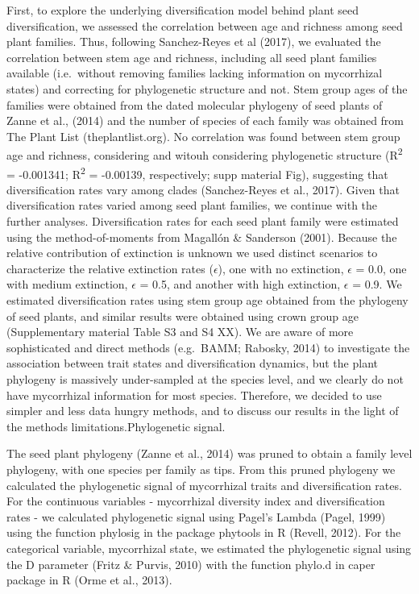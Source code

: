 \documentclass[12pt,]{article}
\begin{document}
First, to explore the underlying diversification model behind plant seed
diversification, we assessed the correlation between age and richness
among seed plant families. Thus, following Sanchez-Reyes et al (2017),
we evaluated the correlation between stem age and richness, including
all seed plant families available (i.e.~without removing families
lacking information on mycorrhizal states) and correcting for
phylogenetic structure and not. Stem group ages of the families were
obtained from the dated molecular phylogeny of seed plants of Zanne et
al., (2014) and the number of species of each family was obtained from
The Plant List (theplantlist.org). No correlation was found between stem
group age and richness, considering and witouh considering phylogenetic
structure (R\textsuperscript{2} = -0.001341; R\textsuperscript{2} =
-0.00139, respectively; supp material Fig), suggesting that
diversification rates vary among clades (Sanchez-Reyes et al., 2017).
Given that diversification rates varied among seed plant families, we
continue with the further analyses. Diversification rates for each seed
plant family were estimated using the method-of-moments from Magallón \&
Sanderson (2001). Because the relative contribution of extinction is
unknown we used distinct scenarios to characterize the relative
extinction rates (\(\epsilon\)), one with no extinction, \(\epsilon\) =
0.0, one with medium extinction, \(\epsilon\) = 0.5, and another with
high extinction, \(\epsilon\) = 0.9. We estimated diversification rates
using stem group age obtained from the phylogeny of seed plants, and
similar results were obtained using crown group age (Supplementary
material Table S3 and S4 XX). We are aware of more sophisticated and
direct methods (e.g.~BAMM; Rabosky, 2014) to investigate the association
between trait states and diversification dynamics, but the plant
phylogeny is massively under-sampled at the species level, and we
clearly do not have mycorrhizal information for most species. Therefore,
we decided to use simpler and less data hungry methods, and to discuss
our results in the light of the methods limitations.Phylogenetic signal.

The seed plant phylogeny (Zanne et al., 2014) was pruned to obtain a
family level phylogeny, with one species per family as tips. From this
pruned phylogeny we calculated the phylogenetic signal of mycorrhizal
traits and diversification rates. For the continuous variables -
mycorrhizal diversity index and diversification rates - we calculated
phylogenetic signal using Pagel's Lambda (Pagel, 1999) using the
function phylosig in the package phytools in R (Revell, 2012). For the
categorical variable, mycorrhizal state, we estimated the phylogenetic
signal using the D parameter (Fritz \& Purvis, 2010) with the function
phylo.d in caper package in R (Orme et al., 2013).
\end{document}
